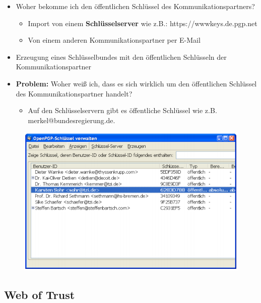 \documentclass[openany]{book}
\begin{document}
\begin{itemize}
    \item Woher bekomme ich den öffentlichen Schlüssel des Kommunikationspartners?
    \begin{itemize}
        \item Import von einem \textbf{Schlüsselserver} wie z.B.: https://wwwkeys.de.pgp.net
        \item Von einem anderen Kommunikationspartner per E-Mail
    \end{itemize}
    \item Erzeugung eines Schlüsselbundes mit den öffentlichen Schlüsseln der Kommunikationspartner
    \item \textbf{Problem:} Woher weiß ich, dass es sich wirklich um den öffentlichen Schlüssel des Kommunikationspartner handelt?
    \begin{itemize}
        \item Auf den Schlüsselservern gibt es öffentliche Schlüssel wie z.B. merkel@bundesregierung.de.
    \end{itemize}
\end{itemize}

\begin{figure}[h!]
    \centering
    \includegraphics[width=0.67\linewidth]{Pics/PGP2.PNG}
\end{figure} 

\subsection{Web of Trust}
\end{document}

